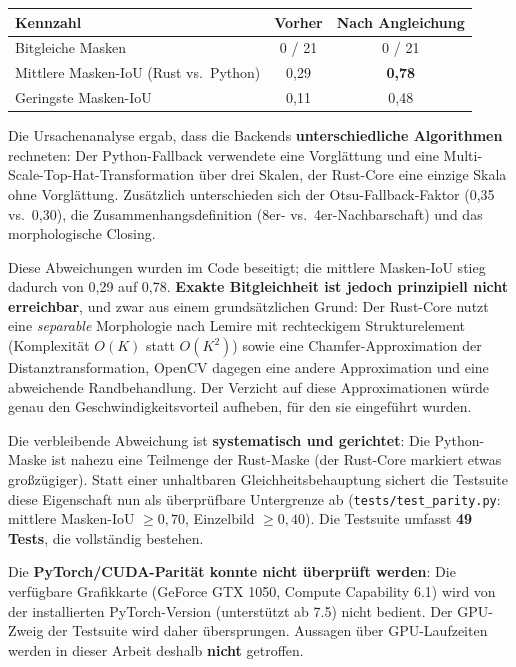 \documentclass[
  11pt,
]{article}
\newcounter{none} %
\begin{document}
{\def\LTcaptype{none} %
\begin{longtable}[]{@{}lcc@{}}
\toprule\noalign{}
Kennzahl & Vorher & Nach Angleichung \\
\midrule\noalign{}
\endhead
\bottomrule\noalign{}
\endlastfoot
Bitgleiche Masken & 0 / 21 & 0 / 21 \\
Mittlere Masken-IoU (Rust vs.~Python) & 0,29 & \textbf{0,78} \\
Geringste Masken-IoU & 0,11 & 0,48 \\
\end{longtable}
}

Die Ursachenanalyse ergab, dass die Backends \textbf{unterschiedliche
Algorithmen} rechneten: Der Python-Fallback verwendete eine Vorglättung
und eine Multi-Scale-Top-Hat-Transformation über drei Skalen, der
Rust-Core eine einzige Skala ohne Vorglättung. Zusätzlich unterschieden
sich der Otsu-Fallback-Faktor (0,35 vs.~0,30), die
Zusammenhangs\-definition (8er- vs.~4er-Nachbarschaft) und das
morphologische Closing.

Diese Abweichungen wurden im Code beseitigt; die mittlere Masken-IoU
stieg dadurch von 0,29 auf 0,78. \textbf{Exakte Bitgleichheit ist jedoch
prinzipiell nicht erreichbar}, und zwar aus einem grundsätzlichen Grund:
Der Rust-Core nutzt eine \emph{separable} Morphologie nach Lemire mit
rechteckigem Strukturelement (Komplexität \(O(K)\) statt \(O(K^2)\))
sowie eine Chamfer-Approximation der Distanztransformation, OpenCV
dagegen eine andere Approximation und eine abweichende Randbehandlung.
Der Verzicht auf diese Approximationen würde genau den
Geschwindigkeitsvorteil aufheben, für den sie eingeführt wurden.

Die verbleibende Abweichung ist \textbf{systematisch und gerichtet}: Die
Python-Maske ist nahezu eine Teilmenge der Rust-Maske (der Rust-Core
markiert etwas großzügiger). Statt einer unhaltbaren
Gleichheitsbehauptung sichert die Testsuite diese Eigenschaft nun als
überprüfbare Untergrenze ab (\texttt{tests/test\_parity.py}: mittlere
Masken-IoU \(\ge 0{,}70\), Einzelbild \(\ge 0{,}40\)). Die Testsuite
umfasst \textbf{49 Tests}, die vollständig bestehen.

Die \textbf{PyTorch/CUDA-Parität konnte nicht überprüft werden}: Die
verfügbare Grafikkarte (GeForce GTX 1050, Compute Capability 6.1) wird
von der installierten PyTorch-Version (unterstützt ab 7.5) nicht
bedient. Der GPU-Zweig der Testsuite wird daher übersprungen. Aussagen
über GPU-Laufzeiten werden in dieser Arbeit deshalb \textbf{nicht}
getroffen.
\end{document}
